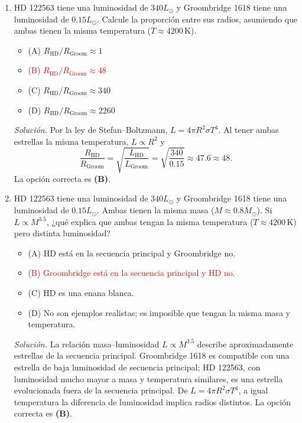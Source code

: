 \documentclass[11pt]{article}
\begin{document}
\begin{enumerate}
    \item HD 122563 tiene una luminosidad de $340L_\odot$ y Groombridge 1618 tiene una luminosidad de $0.15L_\odot$. Calcule la proporción entre sus radios, asumiendo que ambas tienen la misma temperatura ($T\approx4200\,\mathrm{K}$).
    \begin{itemize}
        \item (A) $R_{\mathrm{HD}}/R_{\mathrm{Groom}}\approx1$
        \item \textcolor{red}{(B) $R_{\mathrm{HD}}/R_{\mathrm{Groom}}\approx48$}
        \item (C) $R_{\mathrm{HD}}/R_{\mathrm{Groom}}\approx340$
        \item (D) $R_{\mathrm{HD}}/R_{\mathrm{Groom}}\approx2260$
    \end{itemize}
    \textit{Solución.} Por la ley de Stefan--Boltzmann, $L=4\pi R^2\sigma T^4$. Al tener ambas estrellas la misma temperatura, $L\propto R^2$ y
    \[
        \frac{R_{\mathrm{HD}}}{R_{\mathrm{Groom}}}
        =\sqrt{\frac{L_{\mathrm{HD}}}{L_{\mathrm{Groom}}}}
        =\sqrt{\frac{340}{0.15}}\approx47.6\approx48.
    \]
    La opción correcta es \textbf{(B)}. \parencite{chaparro2026}

    \item HD 122563 tiene una luminosidad de $340L_\odot$ y Groombridge 1618 tiene una luminosidad de $0.15L_\odot$. Ambas tienen la misma masa ($M\approx0.8M_\odot$). Si $L\propto M^{3.5}$, ¿qué explica que ambas tengan la misma temperatura ($T\approx4200\,\mathrm{K}$) pero distinta luminosidad?
    \begin{itemize}
        \item (A) HD está en la secuencia principal y Groombridge no.
        \item \textcolor{red}{(B) Groombridge está en la secuencia principal y HD no.}
        \item (C) HD es una enana blanca.
        \item (D) No son ejemplos realistas; es imposible que tengan la misma masa y temperatura.
    \end{itemize}
    \textit{Solución.} La relación masa--luminosidad $L\propto M^{3.5}$ describe aproximadamente estrellas de la secuencia principal. Groombridge 1618 es compatible con una estrella de baja luminosidad de secuencia principal; HD 122563, con luminosidad mucho mayor a masa y temperatura similares, es una estrella evolucionada fuera de la secuencia principal. De $L=4\pi R^2\sigma T^4$, a igual temperatura la diferencia de luminosidad implica radios distintos. La opción correcta es \textbf{(B)}. \parencite{chaparro2026}


\end{enumerate}
\end{document}

